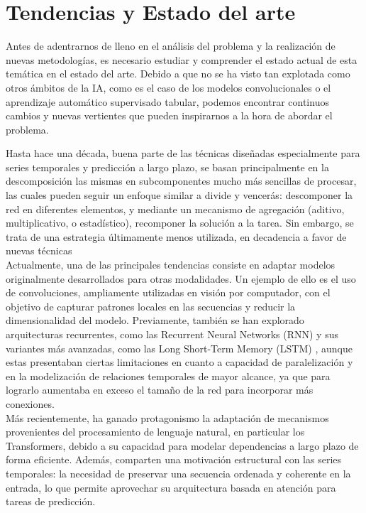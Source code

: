 \chapter{Tendencias y Estado del arte}

Antes de adentrarnos de lleno en el análisis del problema y la realización de nuevas metodologías, es necesario estudiar y comprender el estado actual de esta temática en el estado del arte. Debido a que no se ha visto tan explotada como otros ámbitos de la IA, como es el caso de los modelos convolucionales o el aprendizaje automático supervisado tabular, podemos encontrar continuos cambios y nuevas vertientes que pueden inspirarnos a la hora de abordar el problema.

Hasta hace una década, buena parte de las técnicas diseñadas especialmente para series temporales y predicción a largo plazo, se basan principalmente en la descomposición las mismas en subcomponentes mucho más sencillas de procesar, las cuales pueden seguir un enfoque similar a divide y vencerás: descomponer la red en diferentes elementos, y mediante un mecanismo de agregación (aditivo, multiplicativo, o estadístico), recomponer la solución a la tarea. Sin embargo, se trata de una estrategia últimamente menos utilizada, en decadencia a favor de nuevas técnicas \\

Actualmente, una de las principales tendencias consiste en adaptar modelos originalmente desarrollados para otras modalidades. Un ejemplo de ello es el uso de convoluciones, ampliamente utilizadas en visión por computador, con el objetivo de capturar patrones locales en las secuencias y reducir la dimensionalidad del modelo. Previamente, también se han explorado arquitecturas recurrentes, como las Recurrent Neural Networks (RNN) y sus variantes más avanzadas, como las Long Short-Term Memory (LSTM) \cite{6795963}, aunque estas presentaban ciertas limitaciones en cuanto a capacidad de paralelización y en la modelización de relaciones temporales de mayor alcance, ya que para lograrlo aumentaba en exceso el tamaño de la red para incorporar más conexiones.\\

Más recientemente, ha ganado protagonismo la adaptación de mecanismos provenientes del procesamiento de lenguaje natural, en particular los Transformers, debido a su capacidad para modelar dependencias a largo plazo de forma eficiente. Además, comparten una motivación estructural con las series temporales: la necesidad de preservar una secuencia ordenada y coherente en la entrada, lo que permite aprovechar su arquitectura basada en atención para tareas de predicción.\\

